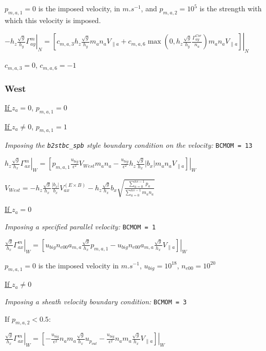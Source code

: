\documentclass[a4paper,10pt]{report}
\begin{document}
$p_{m,a,1}=0$ is the imposed velocity, in $m.s^{-1}$, and $p_{m,a,2}=10^5$ is the strength with which this velocity is imposed.

$\left. -h_z \frac{\sqrt g}{h_y} \Gamma_{ay}^m \right|_N =
\left. \left[
c_{m,a,3} h_z \frac{\sqrt g}{h_y} m_a n_a V_{\parallel a} +
c_{m,a,6} \max \left(
	0, h_z \frac{\sqrt g}{h_y} \frac{\Gamma_{ay}^{Cor}}{n_a}
\right) m_a n_a V_{\parallel a}
\right] \right|_N$

$c_{m,a,3} = 0$, $c_{m,a,6} = -1$

\subsubsection{West}

\underline{If $z_a = 0$}, $p_{m,a,1} = 0$

\underline{If $z_a \neq 0$}, $p_{m,a,1} = 1$

{\em Imposing the {\tt b2stbc\_spb} style boundary condition on the velocity:} {\tt BCMOM = 13}

$ \left. h_z \frac{\sqrt g}{h_x} \Gamma_{ax}^m \right|_W = \left. \left[
	p_{m,a,1} \frac{u_{big}}{\epsilon^2} V_{West} m_a n_a -
	\frac{u_{big}}{\epsilon^2} h_z \frac{\sqrt g}{h_x} |b_x| m_a n_a V_{\parallel a}
\right]
\right|_W$

$V_{West} =
- h_z \frac{\sqrt g}{h_x} \frac{|b_x|}{b_x} V_{ax}^{(E \times B)}
- h_z \frac{\sqrt g}{h_x} b_x
\sqrt{\frac{\sum \limits_{a=0}^{ns-1} p_a}
{\sum \limits_{a=0}^{ns-1} m_a n_a}}$

\underline{If $z_a = 0$}

{\em Imposing a specified parallel velocity:} {\tt BCMOM = 1}

$\left. \frac{\sqrt g}{h_x} \Gamma_{ax}^m \right|_W = \left. \left[
	u_{big} n_{e00} a_{m, a} \frac{\sqrt{g}}{h_x} p_{m,a,1} -
	u_{big} n_{e00} a_{m, a} \frac{\sqrt{g}}{h_x} V_{\parallel a}
\right]
\right|_W$

$p_{m,a,1}=0$ is the imposed velocity in $m.s^{-1}$, $u_{big} = 10^{18}$, $n_{e00} = 10^{20}$

\underline{If $z_a \neq 0$}

{\em Imposing a sheath velocity boundary condition:} {\tt BCMOM = 3}

If $p_{m,a,2} < 0.5$:

$\left. \frac{\sqrt g}{h_x} \Gamma_{ax}^m \right|_W = \left. \left[
	-\frac{u_{big}}{\epsilon^2}  n_a m_a \frac{\sqrt{g}}{h_x} u_{p_{out}}
	-\frac{u_{big}}{\epsilon^2}  n_a m_a \frac{\sqrt{g}}{h_x} V_{\parallel a}
\right]
\right|_W$
\end{document}
